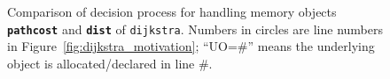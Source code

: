 \begin{figure}[!t]
\centering
{}
\caption{Comparison of decision process for handling memory
objects \texttt{\textbf{pathcost}} and \texttt{\textbf{dist}} of
\texttt{dijkstra}. Numbers in circles are line numbers in
Figure~\ref{fig:dijkstra_motivation}; ``UO=\#'' means the underlying
object is allocated/declared in line \#.}
\label{fig:dijkstra_motivation_comparison}
\end{figure}

